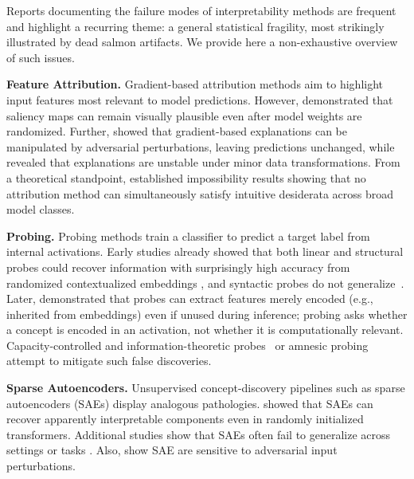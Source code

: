 Reports documenting the failure modes of interpretability methods are frequent and highlight a recurring theme: a general statistical fragility, most strikingly illustrated by dead salmon artifacts. We provide here a non-exhaustive overview of such issues.

\medskip
\noindent\textbf{Feature Attribution.} 
Gradient-based attribution methods \citep{simonyan2014deepinsideconvolutionalnetworks,sundararajan2017axiomatic} aim to highlight input features most relevant to model predictions. However, \citet{adebayo2018sanity} demonstrated that saliency maps can remain visually plausible even after model weights are randomized. Further, \citet{NEURIPS2019_bb836c01} showed that gradient-based explanations can be manipulated by adversarial perturbations, leaving predictions unchanged, while \citet{Ghorbani_Abid_Zou_2019} revealed that explanations are unstable under minor data transformations. From a theoretical standpoint, \citet{bilodeau2024impossibility} established impossibility results showing that no attribution method can simultaneously satisfy intuitive desiderata across broad model classes. 

\medskip
\noindent\textbf{Probing.} 
Probing methods train a classifier to predict a target label from internal activations. Early studies already showed that both linear and structural probes could recover information with surprisingly high accuracy from randomized contextualized embeddings \citep{conneau-etal-2018-cram,hewitt-manning-2019-structural}, and syntactic probes do not generalize~\citep{hall-maudslay-cotterell-2021-syntactic}. Later, \citet{ravichander-etal-2021-probing} demonstrated that probes can extract features merely encoded (e.g., inherited from embeddings) even if unused during inference; probing asks whether a concept is encoded in an activation, not whether it is computationally relevant. Capacity-controlled and information-theoretic probes~\citep{voita-titov-2020-information,zhu-rudzicz-2020-information,pimentel-etal-2020-information,belinkov-2022-probing} or amnesic probing~\citep{elazar-etal-2021-amnesic} attempt to mitigate such false discoveries. 

\medskip
\noindent\textbf{Sparse Autoencoders.} 
Unsupervised concept-discovery pipelines such as sparse autoencoders (SAEs) \citep{cunningham2023sparseautoencodershighlyinterpretable,yun-etal-2021-transformer,bricken2023monosemanticity,templeton2024scaling} display analogous pathologies. 
\citet{heap2025sparseautoencodersinterpretrandomly} showed that SAEs can recover apparently interpretable components even in randomly initialized transformers. Additional studies show that SAEs often fail to generalize across settings or tasks 
\citep{heindrich2025sparseautoencodersgeneralizecase,kantamneni2025sparseautoencodersusefulcase}. Also, \citet{li2025interpretabilityillusionssparseautoencoders} show SAE are sensitive to adversarial input perturbations.

